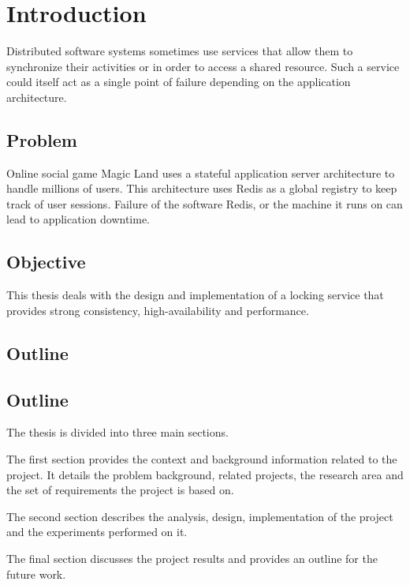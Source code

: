 \chapter{Introduction}
\label{chapter:introduction}

Distributed software systems sometimes use services that allow them to 
synchronize their activities or in order to access a shared resource. Such a
service could itself act as a single point of failure depending on the
application architecture.

\section{Problem}

Online social game Magic Land uses a stateful application server architecture to
handle millions of users. This architecture uses Redis as a global registry to
keep track of user sessions. Failure of the software Redis, or the machine it
runs on can lead to application downtime.

\section{Objective}

This thesis deals with the design and implementation of a locking service that
provides strong consistency, high-availability and performance.

\section{Outline}


\section{Outline}
The thesis is divided into three main sections.

The first section provides the context and background information related to the
project. It details the problem background, related projects, the research
area and the set of requirements the project is based on.

The second section describes the analysis, design, implementation of the project
and the experiments performed on it.

The final section discusses the project results and provides an outline for
the future work.

